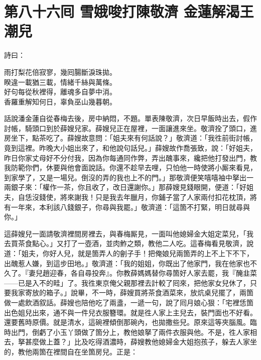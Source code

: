 
\chapter*{第八十六囘 雪娥唆打陳敬濟 金蓮解渴王潮兒}


詩曰：

\begin{myquote}
雨打梨花倍寂寥，幾囘腸斷淚珠拋。\\睽違一載猶三載，情緒千絲與萬條。\\好句每從秋裡得，離魂多自夢中消。\\香羅重解知何日，辜負巫山幾暮朝。
\end{myquote}

話說潘金蓮自從春梅去後，房中納悶，不題。單表陳敬濟，次日早飯時出去，假作討帳，騎頭口到於薛嫂兒家。薛嫂兒正在屋裡，一面讓進來坐。敬濟拴了頭口，進房坐下，點茶吃了。薛嫂故意問：「姐夫來有何話說？」敬濟道：「我徃前街討帳，竟到這裡。昨晚大小姐出來了，和他說句話兒。」薛嫂故作喬張致，{}說：「好姐夫，昨日你家丈母好不分付我，因為你每通同作弊，弄出醜事來，纔把他打發出門，教我防範你們，休要與他會面說話。你還不趁早去哩，只怕他一時使將小厮來看見，到家學了，又是一場兒。倒沒的弄的我也上不的門。」那敬濟便笑嘻嘻袖中拏出一兩銀子來：「權作一茶，你且收了，改日還謝你。」那薛嫂見錢眼開，便道：「好姐夫，自恁沒錢使，將來謝我！只是我去年臘月，你鋪子當了人家兩付扣花枕頂，將有一年來，本利該八錢銀子，你尋與我罷。」{}敬濟道：「這箇不打緊，明日就尋與你。」

這薛嫂兒一面請敬濟裡間房裡去，與春梅厮見，一面叫他媳婦金大姐定菜兒，「我去買茶食點心。」又打了一壺酒，並肉鮓之類，教他二人吃。這春梅看見敬濟，說道：「姐夫，你好人兒，就是箇弄人的劊子手！把俺娘兒兩箇弄的上不上下不下，出醜惹人嫌，到這步田地。」{}敬濟道：「我的姐姐，你既出了他家門，我在他家也不久了。『妻兒趙迎春，各自尋投奔』。你教薛媽媽替你尋箇好人家去罷，我『醃韭菜——已是入不的畦」了。我徃東京俺父親那裡去計較了囘來，把他家女兒休了，只要我家寄放的箱子。」說畢，不一時，薛嫂買將茶食酒菜來，放炕桌兒擺了，兩箇做一處飲酒叙話。薛嫂也陪他吃了兩盞，一遞一句，說了囘月娘心狠：「宅裡恁箇出色姐兒出來，通不與一件兒衣服簪環。就是徃人家上主兒去，裝門面也不好看。還要舊時原價。就是清水，這碗裡傾倒那碗內，也拋撒些兒。原來這等夾腦風。臨時出門，倒虧了小玉丫頭做了箇分上，教他娘拏了兩件衣服與他。不是，徃人家相去，拏甚麼做上蓋？」比及吃得酒濃時，薛嫂教他媳婦金大姐抱孩子，躲去人家坐的，教他兩箇在裡間自在坐箇房兒。{}正是：

